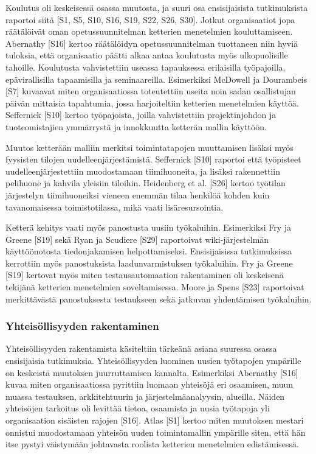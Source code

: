 Koulutus oli keskeisessä osassa muutosta, ja suuri osa ensisijaisista
tutkimuksista raportoi siitä [S1, S5, S10, S16, S19, S22, S26, S30]. Jotkut
organisaatiot jopa räätälöivät oman opetussuunnitelman ketterien menetelmien
kouluttamiseen. Abernathy [S16] kertoo räätälöidyn opetussuunnitelman tuottaneen
niin hyviä tuloksia, että organisaatio päätti alkaa antaa koulutusta myös
ulkopuolisille tahoille. Koulutusta vahvistettiin useassa tapauksessa
erilaisilla työpajoilla, epävirallisilla tapaamisilla ja seminaareilla.
Esimerkiksi McDowell ja Dourambeis [S7] kuvaavat miten organisaatiossa
toteutettiin useita noin sadan osallistujan päivän mittaisia tapahtumia, jossa
harjoiteltiin ketterien menetelmien käyttöä. Seffernick [S10] kertoo
työpajoista, joilla vahvistettiin projektinjohdon ja tuoteomistajien ymmärrystä
ja innokkuutta ketterän mallin käyttöön.

Muutos ketterään malliin merkitsi toimintatapojen muuttamisen lisäksi myös
fyysisten tilojen uudelleenjärjestämistä. Seffernick [S10] raportoi että
työpisteet uudelleenjärjestettiin muodostamaan tiimihuoneita, ja lisäksi
rakennettiin pelihuone ja kahvila yleisiin tiloihin. Heidenberg et al. [S26]
kertoo työtilan järjestelyn tiimihuoneiksi vieneen enemmän tilaa henkilöä kohden
kuin tavanomaisessa toimistotilassa, mikä vaati lisäresursointia.

Ketterä kehitys vaati myös panostusta uusiin työkaluihin. Esimerkiksi Fry ja
Greene [S19] sekä Ryan ja Scudiere [S29] raportoivat wiki-järjestelmän
käyttöönotosta tiedonjakamisen helpottamiseksi. Ensisijaisissa tutkimuksissa
kerrottiin myös panostuksista laadunvarmistuksen työkaluihin. Fry ja Greene
[S19] kertovat myös miten testausautomaation rakentaminen oli keskeisenä
tekijänä ketterien menetelmien soveltamisessa. Moore ja Spens [S23] raportoivat
merkittävästä panostuksesta testaukseen sekä jatkuvan yhdentämisen työkaluihin.

\subsubsection{Yhteisöllisyyden rakentaminen}

Yhteisöllisyyden rakentamista käsiteltiin tärkeänä asiana suuressa osassa
ensisijaisia tutkimuksia. Yhteisöllisyyden luominen uusien työtapojen ympärille
on keskeistä muutoksen juurruttamisen kannalta. Esimerkiksi Abernathy [S16]
kuvaa miten organisaatiossa pyrittiin luomaan yhteisöjä eri osaamisen, muun
muassa testauksen, arkkitehtuurin ja järjestelmäanalyysin, alueilla.
Näiden yhteisöjen tarkoitus oli levittää tietoa, osaamista ja uusia työtapoja
yli organisaation sisäisten rajojen [S16]. Atlas [S1] kertoo miten muutoksen
mestari onnistui muodostamaan yhteisön uuden toimintamallin ympärille siten,
että hän itse pystyi väistymään johtavasta roolista ketterien menetelmien
edistämisessä.

